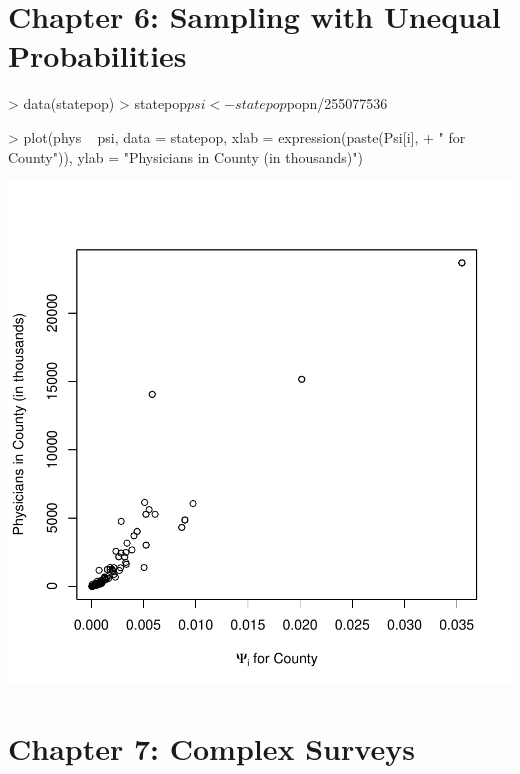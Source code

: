 \documentclass[article, 11pt, oneside]{memoir}
\begin{document}
\chapter{Chapter 6: Sampling with Unequal Probabilities}

%

\begin{Schunk}
\begin{Sinput}
> data(statepop)
> statepop$psi <- statepop$popn/255077536
\end{Sinput}
\end{Schunk}

\begin{Schunk}
\begin{Sinput}
> plot(phys ~ psi, data = statepop, xlab = expression(paste(Psi[i], 
+     " for County")), ylab = "Physicians in County (in thousands)")
\end{Sinput}
\end{Schunk}
\includegraphics{SDA_using_survey-006}


\chapter{Chapter 7: Complex Surveys}
\end{document}
